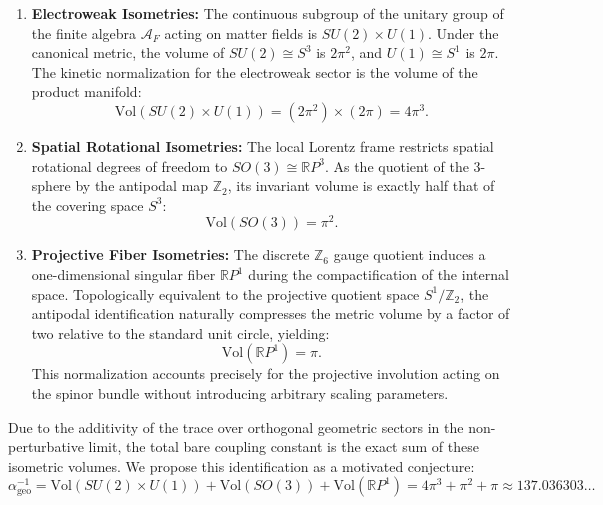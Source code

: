 \documentclass[12pt,a4paper]{article}
\begin{document}
\begin{enumerate}
    \item \textbf{Electroweak Isometries:} The continuous subgroup of the unitary group of the finite algebra $\mathcal{A}_F$ acting on matter fields is $SU(2) \times U(1)$. Under the canonical metric, the volume of $SU(2) \cong S^3$ is $2\pi^2$, and $U(1) \cong S^1$ is $2\pi$. The kinetic normalization for the electroweak sector is the volume of the product manifold:
    \begin{equation}
    \text{Vol}(SU(2) \times U(1)) = (2\pi^2) \times (2\pi) = 4\pi^3.
    \end{equation}
   
    \item \textbf{Spatial Rotational Isometries:} The local Lorentz frame restricts spatial rotational degrees of freedom to $SO(3) \cong \mathbb{R}P^3$. As the quotient of the 3-sphere by the antipodal map $\mathbb{Z}_2$, its invariant volume is exactly half that of the covering space $S^3$:
    \begin{equation}
    \text{Vol}(SO(3)) = \pi^2.
    \end{equation}
   
    \item \textbf{Projective Fiber Isometries:} The discrete $\mathbb{Z}_6$ gauge quotient induces a one-dimensional singular fiber $\mathbb{R}P^1$ during the compactification of the internal space. Topologically equivalent to the projective quotient space $S^1/\mathbb{Z}_2$, the antipodal identification naturally compresses the metric volume by a factor of two relative to the standard unit circle, yielding:
    \begin{equation}
    \text{Vol}(\mathbb{R}P^1) = \pi.
    \end{equation}
    This normalization accounts precisely for the projective involution acting on the spinor bundle without introducing arbitrary scaling parameters.
\end{enumerate}

Due to the additivity of the trace over orthogonal geometric sectors in the non-perturbative limit, the total bare coupling constant is the exact sum of these isometric volumes. We propose this identification as a motivated conjecture:
\begin{equation}
\boxed{\alpha^{-1}_{\text{geo}} = \text{Vol}(SU(2) \times U(1)) + \text{Vol}(SO(3)) + \text{Vol}(\mathbb{R}P^1) = 4\pi^3 + \pi^2 + \pi \approx 137.036303\dots}
\end{equation}
\end{document}
